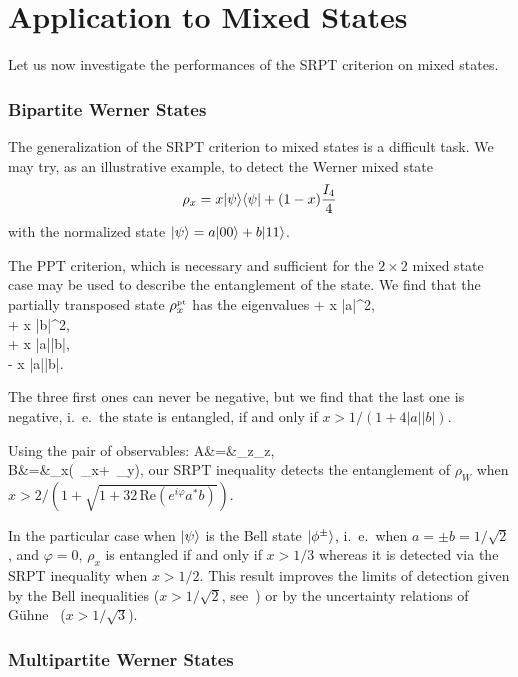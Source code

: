 \section{Application to Mixed States} \label{sec-SRPTmix}

Let us now investigate the performances of the SRPT criterion on mixed states.

\subsubsection{Bipartite Werner States}

The generalization of the SRPT criterion to mixed states is a difficult task. We may try, as an illustrative example, to detect the Werner mixed state ~\cite{Wer89}
\[ \rho_x = x | \psi \rangle \langle \psi | +  (1-x)\frac{I_4}4\]
with the normalized state $| \psi \rangle = a | 00 \rangle + b | 11 \rangle$.

The PPT criterion, which is necessary and sufficient for the $2\times 2$ mixed state case may be used to describe the entanglement of the state. We find that the partially transposed state $\rho^{\mbox{\tiny \textup{pt}}}_x$ has the eigenvalues
\bea
{} + x |a|^2, \\
 + x |b|^2, \\
 + x |a||b|, \\
 - x |a||b|.
\eea

The three first ones can never be negative, but we find that the last one is negative, i.~e.~the state is entangled, if and only if $ x > 1 / (1+4|a||b|).$

Using the pair of observables:
\bea A&=&\sigma_z\otimes\sigma_z, \\
B&=&\sigma_x\otimes(\cos\varphi\, \sigma_x+\sin\varphi \, \sigma_y),
\eea
our SRPT inequality detects the entanglement of  $\rho_W$ when $x > 2/(1+\sqrt{1+32\, \mbox{Re}(e^{i \varphi} a^* b)})$.

In the particular case when $| \psi \rangle$ is the Bell state $| \phi^\pm \rangle$, i.~e.~when $a=\pm b = 1/ \sqrt 2$, and $\varphi=0$, $\rho_x$ is entangled if and only if $x > 1/3$ whereas it is detected via the SRPT inequality  when $x > 1/2$. This result improves the limits of detection given by the Bell inequalities ($x > 1 / {\sqrt 2}$, see~\cite{Per96}) or by the uncertainty relations of G\"uhne~\cite{Guh04} ($x> 1/{\sqrt 3}$).

\subsubsection{Multipartite Werner States}

